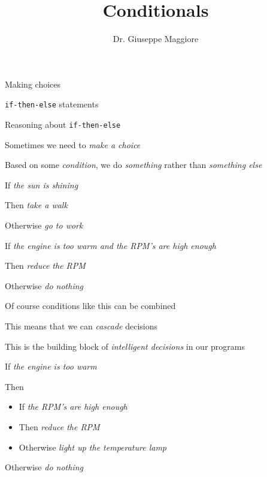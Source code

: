 \documentclass{beamer}
\title{Conditionals}
\author{Dr. Giuseppe Maggiore}
\institute{Hogeschool Rotterdam \\ 
Rotterdam, Netherlands}
\date{}
\begin{document}
\maketitle

\begin{slide}{
\item Making choices
\item \texttt{if-then-else} statements
\item Reasoning about \texttt{if-then-else}
}\end{slide}

\begin{slide}{
\item Sometimes we need to \textit{make a choice}
\item Based on some \textit{condition}, we do \textit{something} rather than \textit{something else}
}\end{slide}

\begin{slide}{
\item If \textit{the sun is shining}
\item Then \textit{take a walk}
\item Otherwise \textit{go to work}
}\end{slide}

\begin{slide}{
\item If \textit{the engine is too warm and the RPM's are high enough}
\item Then \textit{reduce the RPM}
\item Otherwise \textit{do nothing}
}\end{slide}

\begin{slide}{
\item Of course conditions like this can be combined
\item This means that we can \textit{cascade} decisions
\item This is the building block of \textit{intelligent decisions} in our programs
}\end{slide}

\begin{slide}{
\item If \textit{the engine is too warm}
\item Then
\begin{itemize}
\item If \textit{the RPM's are high enough}
\item Then \textit{reduce the RPM}
\item Otherwise \textit{light up the temperature lamp}
\end{itemize}
\item Otherwise \textit{do nothing}
}\end{slide}
\end{document}
